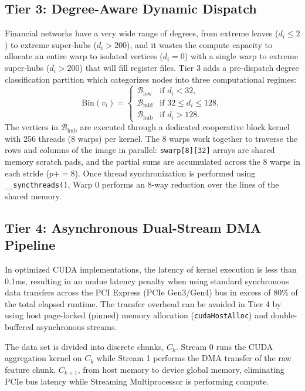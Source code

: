 \documentclass[journal]{IEEEtran}
\begin{document}
\subsection{Tier 3: Degree-Aware Dynamic Dispatch}
Financial networks have a very wide range of degrees, from extreme leaves ($d_i \le 2$) to extreme super-hubs ($d_i > 200$), and it wastes the compute capacity to allocate an entire warp to isolated vertices ($d_i = 0$) with a single warp to extreme super-hubs ($d_i > 200$) that will fill register files. Tier 3 adds a pre-dispatch degree classification partition which categorizes nodes into three computational regimes:
\begin{equation}
    \text{Bin}(v_i) = \begin{cases}
        \mathcal{B}_{\text{low}} & \text{if } d_i < 32, \\
        \mathcal{B}_{\text{mid}} & \text{if } 32 \le d_i \le 128, \\
        \mathcal{B}_{\text{hub}} & \text{if } d_i > 128.
    \end{cases}
    \label{eq:bins}
\end{equation}
The vertices in $\mathcal{B}_{\text{hub}}$ are executed through a dedicated cooperative block kernel with 256 threads (8 warps) per kernel. The 8 warps work together to traverse the rows and columns of the image in parallel: \texttt{swarp[8][32]} arrays are shared memory scratch pads, and the partial sums are accumulated across the 8 warps in each stride ($p += 8$). Once thread synchronization is performed using \texttt{\_\_syncthreads()}, Warp 0 performs an 8-way reduction over the lines of the shared memory.

\subsection{Tier 4: Asynchronous Dual-Stream DMA Pipeline}
In optimized CUDA implementations, the latency of kernel execution is less than 0.1ms, resulting in an undue latency penalty when using standard synchronous data transfers across the PCI Express (PCIe Gen3/Gen4) bus in excess of 80\% of the total elapsed runtime. The transfer overhead can be avoided in Tier 4 by using host page-locked (pinned) memory allocation (\texttt{cudaHostAlloc}) and double-buffered asynchronous streams.

The data set is divided into discrete chunks, $C_k$. Stream 0 runs the CUDA aggregation kernel on $C_k$ while Stream 1 performs the DMA transfer of the raw feature chunk, $C_{k+1}$, from host memory to device global memory, eliminating PCIe bus latency while Streaming Multiprocessor is performing compute.
\end{document}
